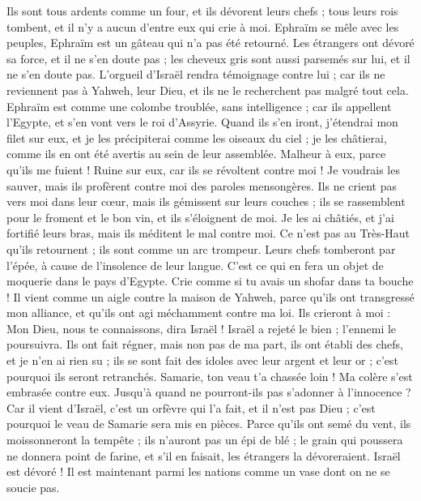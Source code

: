 \begin{multicols}{2}
Ils sont tous ardents comme un four, et ils dévorent leurs chefs ; tous leurs rois tombent, et il n'y a aucun d'entre eux qui crie à moi.
Ephraïm se mêle avec les peuples, Ephraïm est un gâteau qui n'a pas été retourné.
Les étrangers ont dévoré sa force, et il ne s'en doute pas ; les cheveux gris sont aussi parsemés sur lui, et il ne s'en doute pas.
L'orgueil d'Israël rendra témoignage contre lui ; car ils ne reviennent pas à Yahweh, leur Dieu, et ils ne le recherchent pas malgré tout cela. 
Ephraïm est comme une colombe troublée, sans intelligence ; car ils appellent l'Egypte, et s'en vont vers le roi d'Assyrie.
Quand ils s'en iront, j'étendrai mon filet sur eux, et je les précipiterai comme les oiseaux du ciel ; je les châtierai, comme ils en ont été avertis au sein de leur assemblée.
Malheur à eux, parce qu'ils me fuient ! Ruine sur eux, car ils se révoltent contre moi ! Je voudrais les sauver, mais ils profèrent contre moi des paroles mensongères.
Ils ne crient pas vers moi dans leur cœur, mais ils gémissent sur leurs couches ; ils se rassemblent pour le froment et le bon vin, et ils s'éloignent de moi.
Je les ai châtiés, et j'ai fortifié leurs bras, mais ils méditent le mal contre moi.
Ce n'est pas au Très-Haut qu'ils retournent ; ils sont comme un arc trompeur. Leurs chefs tomberont par l'épée, à cause de l'insolence de leur langue. C'est ce qui en fera un objet de moquerie dans le pays d'Egypte.
\VerseOne{}Crie comme si tu avais un shofar dans ta bouche ! Il vient comme un aigle contre la maison de Yahweh, parce qu'ils ont transgressé mon alliance, et qu'ils ont agi méchamment contre ma loi.
Ils crieront à moi : Mon Dieu, nous te connaissons, dira Israël !
Israël a rejeté le bien ; l'ennemi le poursuivra.
Ils ont fait régner, mais non pas de ma part, ils ont établi des chefs, et je n'en ai rien su ; ils se sont fait des idoles avec leur argent et leur or ; c'est pourquoi ils seront retranchés.
Samarie, ton veau t'a chassée loin ! Ma colère s'est embrasée contre eux. Jusqu'à quand ne pourront-ils pas s'adonner à l'innocence ?
Car il vient d'Israël, c'est un orfèvre qui l'a fait, et il n'est pas Dieu ; c'est pourquoi le veau de Samarie sera mis en pièces.
Parce qu'ils ont semé du vent, ils moissonneront la tempête ; ils n'auront pas un épi de blé ; le grain qui poussera ne donnera point de farine, et s'il en faisait, les étrangers la dévoreraient.
Israël est dévoré ! Il est maintenant parmi les nations comme un vase dont on ne se soucie pas.

\end{multicols}
